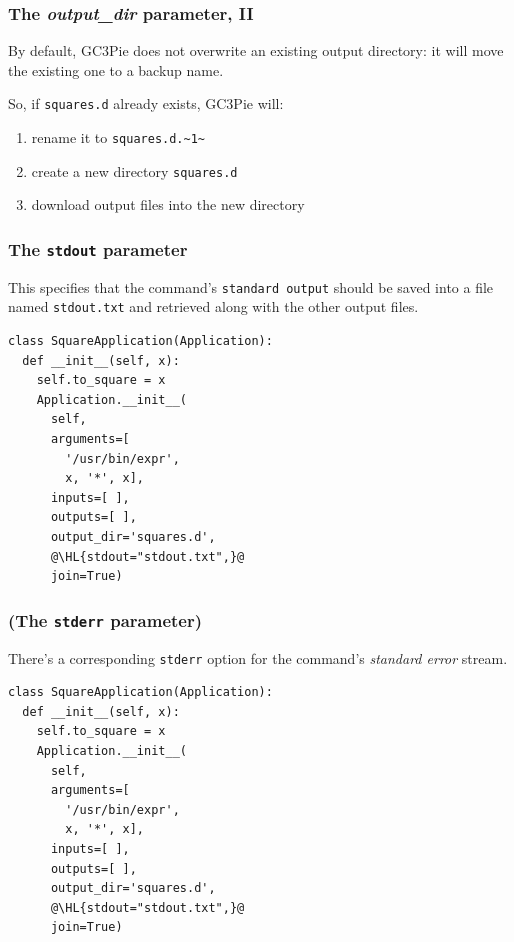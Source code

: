 \documentclass[english,serif,mathserif,xcolor=pdftex,dvipsnames,table]{beamer}
\begin{document}
\begin{frame}[fragile]
  \frametitle{The \emph{output\_dir} parameter, II}
  
  By default, GC3Pie does not overwrite an existing output directory:
  it will move the existing one to a backup name.

  \+
  So, if \texttt{squares.d} already exists, GC3Pie will:
  \begin{enumerate}
  \item rename it to \lstinline|squares.d.~1~|
  \item create a new directory \texttt{squares.d}
  \item download output files into the new directory
  \end{enumerate}
\end{frame}


\begin{frame}[fragile]
\frametitle{The \texttt{stdout} parameter}

This specifies that the command's \texttt{standard output} should be
saved into a file named \texttt{stdout.txt} and retrieved along with
the other output files.

  \+
\begin{lstlisting}
class SquareApplication(Application):
  def __init__(self, x):
    self.to_square = x
    Application.__init__(
      self,
      arguments=[
        '/usr/bin/expr', 
        x, '*', x],
      inputs=[ ],
      outputs=[ ],
      output_dir='squares.d',
      @\HL{stdout="stdout.txt",}@
      join=True)
\end{lstlisting}
\end{frame}


\begin{frame}[fragile]
\frametitle{(The \texttt{stderr} parameter)}

There's a corresponding \texttt{stderr} option for the command's
\emph{standard error} stream.

  \+
\begin{lstlisting}
class SquareApplication(Application):
  def __init__(self, x):
    self.to_square = x
    Application.__init__(
      self,
      arguments=[
        '/usr/bin/expr', 
        x, '*', x],
      inputs=[ ],
      outputs=[ ],
      output_dir='squares.d',
      @\HL{stdout="stdout.txt",}@
      join=True)
\end{lstlisting}
\end{frame}
\end{document}
